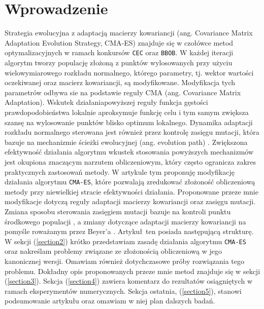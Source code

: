
\section{Wprowadzenie}
Strategia ewolucyjna z adaptacją macierzy kowariancji (ang. Covariance Matrix Adaptation Evolution Strategy, CMA-ES) \cite{cma-es} znajduje się w czołówce metod optymalizacyjnych w ramach konkursów \texttt{CEC} oraz \texttt{BBOB}. W każdej iteracji algorytm tworzy populację złożoną z punktów wylosowanych przy użyciu wielowymiarowego rozkładu normalnego, którego parametry, tj. wektor wartości oczekiwanej oraz macierz kowariancji, są modyfikowane. Modyfikacja tych parametrów odbywa sie na podstawie reguły CMA (ang. Covariance Matrix Adaptation). Wskutek działaniapowyższej reguły funkcja gęstości prawdopodobieństwa lokalnie aproksymuje funkcję celu i tym samym zwiększa szansę na wylosowanie punktów blisko optimum lokalnego. Dynamika adaptacji rozkładu normalnego sterowana jest również przez kontrolę zasięgu mutacji, która bazuje na mechanizmie ścieżki ewolucyjnej (ang. evolution path) \cite{evol-path}. Zwiększona efektywność działania algorytmu wkustek stosowania powyższych mechanizmów jest okupiona znaczącym narzutem obliczeniowym, który często ogranicza zakres praktycznych zastosowań metody.
W artykule tym proponuję modyfikację działania algorytmu \texttt{CMA-ES}, które pozwalają zredukować złożoność obliczeniową metody przy niewielkiej stracie efektywności działania. Proponowane przeze mnie modyfikacje dotyczą reguły adaptacji macierzy kowariancji oraz zasięgu mutacji. Zmiana sposobu sterowania zasięgiem mutacji bazuje na kontroli punktu środkowego populacji \cite{midpoint}, a zmiany dotyczące adaptacji macierzy kowariancji na pomyśle roważanym przez Beyer'a \cite{simplify-covariance-matrix}.
Artykuł ten posiada następującą strukturę. W sekcji (\ref{section2}) krótko przedstawiam zasadę działania algorytmu \texttt{CMA-ES} oraz nakreślam problemy związane ze złożonością obliczeniową w jego kanonicznej wersji. Omawiam również dotychczasowe próby rozwiązania tego problemu. Dokładny opis proponowanych przeze mnie metod znajduje się w sekcji (\ref{section3}). Sekcja (\ref{section4}) zawiera komentarz do rezultatów osiągniętych w ramach eksperymentów numerycznych. Sekcja ostatnia, (\ref{section5}), stanowi podsumowanie artykułu oraz omawiam w niej plan dalszych badań. 

